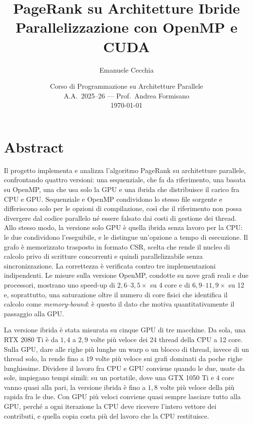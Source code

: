 \documentclass[11pt,a4paper]{article}
\title{\textbf{PageRank su Architetture Ibride}\\[2mm]
       \large Parallelizzazione con OpenMP e CUDA}
\author{Emanuele Cecchia}
\date{Corso di Programmazione su Architetture Parallele\\
      A.A.\ 2025--26 --- Prof.\ Andrea Formisano\\[2mm]\today}
\begin{document}
\maketitle

\section*{Abstract}
Il progetto implementa e analizza l'algoritmo PageRank su architetture
parallele, confrontando quattro versioni: una sequenziale, che fa da riferimento, una basata su OpenMP,
una che usa solo la GPU e una ibrida che distribuisce il carico fra CPU e GPU.
Sequenziale e OpenMP condividono lo stesso file sorgente e differiscono
solo per le opzioni di compilazione, così che il riferimento non possa
divergere dal codice parallelo né essere falsato dai costi di gestione dei
thread. Allo stesso modo, la versione solo GPU è quella ibrida senza
lavoro per la CPU: le due condividono l'eseguibile, e le distingue
un'opzione a tempo di esecuzione. Il grafo è memorizzato trasposto in formato CSR, scelta che rende il
nucleo di calcolo privo di scritture concorrenti e quindi parallelizzabile
senza sincronizzazione. La correttezza è verificata contro tre
implementazioni indipendenti. Le misure sulla versione OpenMP, condotte su
nove grafi reali e due processori, mostrano uno
speed-up di $2{,}6$--$3{,}5\times$ su 4 core e di $6{,}9$--$11{,}9\times$ su 12
e, soprattutto, una
saturazione oltre il numero di core fisici che identifica il calcolo come
\emph{memory-bound}: è questo il dato che motiva quantitativamente il
passaggio alla GPU.

La versione ibrida è stata misurata su cinque GPU di tre macchine.
Da sola, una RTX 2080 Ti è da $1{,}4$ a $2{,}9$ volte più veloce dei 24 thread
della CPU a 12 core. Sulla GPU, dare alle righe più lunghe un warp o un
blocco di thread, invece di un thread solo, la rende fino a $19$ volte più
veloce sui grafi dominati da poche righe lunghissime. Dividere il lavoro fra CPU e GPU conviene quando le due,
usate da sole, impiegano tempi simili: su un portatile, dove una GTX 1050 Ti
e 4 core vanno quasi alla pari, la versione ibrida è fino a $1{,}8$ volte più
veloce della più rapida fra le due. Con GPU più veloci conviene quasi sempre lasciare
tutto alla GPU, perché a ogni iterazione la CPU deve ricevere l'intero vettore
dei contributi, e quella copia costa più del lavoro che la CPU restituisce.
\end{document}
